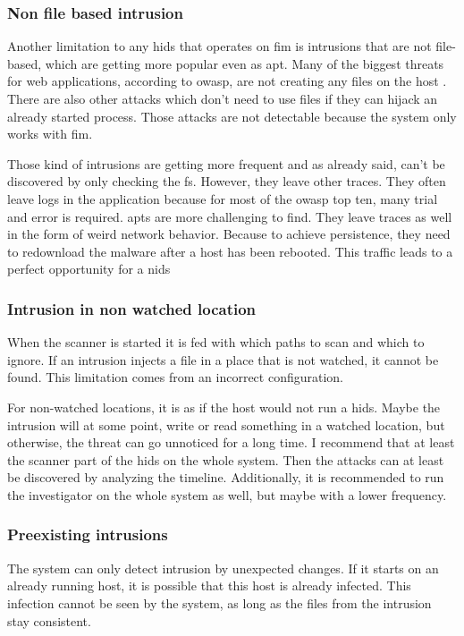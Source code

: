 \subsubsection{Non file based \gls{intrusion}}
\label{sec:limitation:nonFileBased}
Another limitation to any \gls{hids} that operates on \gls{fim} is \glspl{intrusion} that are not file-based, which are getting more popular even as \gls{apt}. Many of the biggest threats for web applications, according to \gls{owasp}, are not creating any files on the host \cite{owasp}. There are also other attacks which don't need to use files if they can hijack an already started process. Those attacks are not detectable because the system only works with \gls{fim}.

Those kind of \glspl{intrusion} are getting more frequent and as already said, can't be discovered by only checking the \gls{fs}. However, they leave other traces. They often leave logs in the application because for most of the \gls{owasp} top ten, many trial and error is required. \gls{apt}s are more challenging to find. They leave traces as well in the form of weird network behavior. Because to achieve persistence, they need to redownload the malware after a host has been rebooted. This traffic leads to a perfect opportunity for a \gls{nids}

\subsubsection{Intrusion in non watched location}
\label{sec:limitation:nonWatched}
When the scanner is started it is fed with which paths to scan and which to ignore. If an \gls{intrusion} injects a file in a place that is not watched, it cannot be found. This limitation comes from an incorrect configuration.

For non-watched locations, it is as if the host would not run a \gls{hids}. Maybe the \gls{intrusion} will at some point, write or read something in a watched location, but otherwise, the threat can go unnoticed for a long time. I recommend that at least the scanner part of the \gls{hids} on the whole system. Then the attacks can at least be discovered by analyzing the timeline. Additionally, it is recommended to run the investigator on the whole system as well, but maybe with a lower frequency.

\subsubsection{Preexisting \glspl{intrusion}}
\label{sec:limitation:preexisting}
The system can only detect \gls{intrusion} by unexpected changes. If it starts on an already running host, it is possible that this host is already infected. This infection cannot be seen by the system, as long as the files from the \gls{intrusion} stay consistent. 

